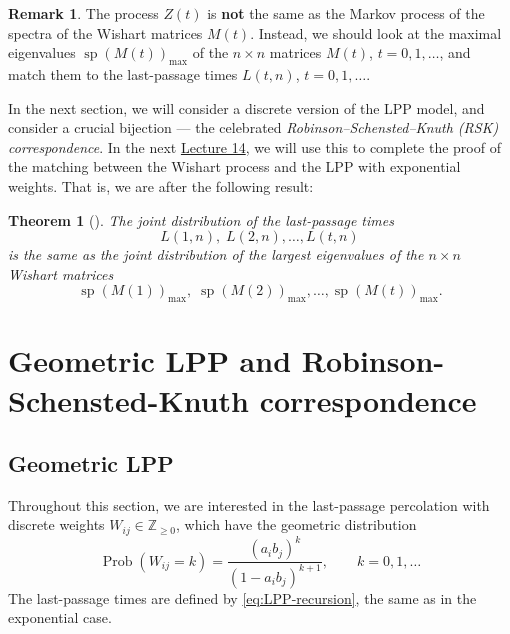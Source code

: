 \documentclass[letterpaper,11pt,oneside,reqno]{article}
\numberwithin{equation}{section}
\newtheorem{theorem}[proposition]{Theorem}
\theoremstyle{definition}
\newtheorem{remark}[proposition]{Remark}
\begin{document}
\begin{remark}
	The process $Z(t)$ is \textbf{not} the same as the
	Markov process of the spectra of the Wishart matrices
	$M(t)$. Instead, we should look at the maximal eigenvalues
	$\operatorname{sp}(M(t))_{\max}$
	of the $n\times n$ matrices $M(t)$, $t=0,1,\ldots$,
	and match them to the last-passage times
	$L(t,n)$, $t=0,1,\ldots$.
\end{remark}

In the next section, we will consider a discrete version of the
LPP model, and consider a crucial bijection --- the celebrated
\emph{Robinson--Schensted--Knuth (RSK) correspondence}.
In the next \href{https://lpetrov.cc/rmt25/rmt25-notes/rmt2025-l14.pdf}{Lecture 14}, we will
use this to complete the proof of the matching between the
Wishart process and the LPP with exponential weights.
That is, we are after the following result:
\begin{theorem}[\cite{dieker2008largest}]
	\label{thm:matching}
	The joint distribution of the last-passage times
	\begin{equation*}
		L(1,n),\;L(2,n),\ldots,L(t,n)
	\end{equation*}
	is the same as the joint distribution of the largest
	eigenvalues
	of the $n\times n$ Wishart matrices
	\begin{equation*}
		\operatorname{sp}(M(1))_{\max},\;\operatorname{sp}(M(2))_{\max},\ldots,\operatorname{sp}(M(t))_{\max}.
	\end{equation*}
\end{theorem}


\section{Geometric LPP and Robinson-Schensted-Knuth correspondence}

\subsection{Geometric LPP}

Throughout this section, we are interested in the
last-passage percolation with discrete weights $W_{ij}\in \mathbb{Z}_{\ge0}$,
which have the geometric distribution
\begin{equation}
	\label{eq:geometric}
	\operatorname{Prob}(W_{ij}=k) = \frac{(a_i b_j)^{k}}{(1 - a_ib_j)^{k+1}}, \qquad k=0,1,\ldots
\end{equation}
The last-passage times are defined by \eqref{eq:LPP-recursion},
the same as in the exponential case.
\end{document}
